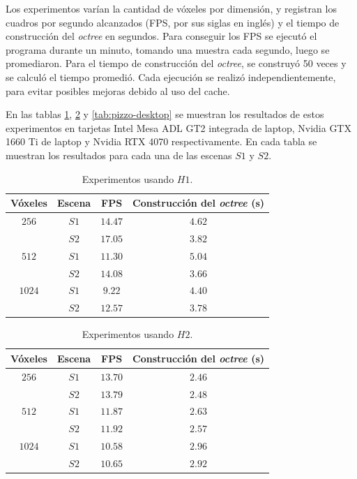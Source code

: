 Los experimentos varían la cantidad de vóxeles por dimensión, y registran los cuadros por segundo alcanzados (FPS, por sus siglas en inglés) y el tiempo de construcción del \textit{octree} en segundos.
Para conseguir los FPS se ejecutó el programa durante un minuto, tomando una muestra cada segundo, luego se promediaron.
Para el tiempo de construcción del \textit{octree}, se construyó 50 veces y se calculó el tiempo promedió.
Cada ejecución se realizó independientemente, para evitar posibles mejoras debido al uso del cache.

En las tablas \ref{tab:cisco-laptop}, \ref{tab:pizzo-laptop} y \ref{tab:pizzo-desktop} se muestran los resultados de estos experimentos en tarjetas Intel Mesa ADL GT2 integrada de laptop, Nvidia GTX 1660 Ti de laptop y Nvidia RTX 4070 respectivamente.
En cada tabla se muestran los resultados para cada una de las escenas $S1$ y $S2$.

\begin{table}[ht]
\centering
\begin{tabular}{|c|c|c|c|}
	\hline
	\textbf{Vóxeles} & \textbf{Escena} & \textbf{FPS} & \textbf{Construcción del \textit{octree} (s)} \\
	\hline
	$256$ & $S1$ & $14.47$ & $4.62$ \\
	 & $S2$ & $17.05$ & $3.82$ \\
	\hline
	$512$ & $S1$ & $11.30$ & $5.04$ \\
	 & $S2$ & $14.08$ & $3.66$ \\
	\hline
	$1024$ & $S1$ & $9.22$ & $4.40$ \\
	 & $S2$ & $12.57$ & $3.78$ \\
	\hline
\end{tabular}
\caption{Experimentos usando $H1$.}
\label{tab:cisco-laptop}
\end{table}

\begin{table}[hb]
\centering
\begin{tabular}{|c|c|c|c|}
	\hline
	\textbf{Vóxeles} & \textbf{Escena} & \textbf{FPS} & \textbf{Construcción del \textit{octree} (s)} \\
	\hline
	$256$ & $S1$ & $13.70$ & $2.46$ \\
	 & $S2$ & $13.79$ & $2.48$ \\
	\hline
	$512$ & $S1$ & $11.87$ & $2.63$ \\
	 & $S2$ & $11.92$ & $2.57$ \\
	\hline
	$1024$ & $S1$ & $10.58$ & $2.96$ \\
	 & $S2$ & $10.65$ & $2.92$ \\
	\hline
\end{tabular}
\caption{Experimentos usando $H2$.}
\label{tab:pizzo-laptop}
\end{table}

